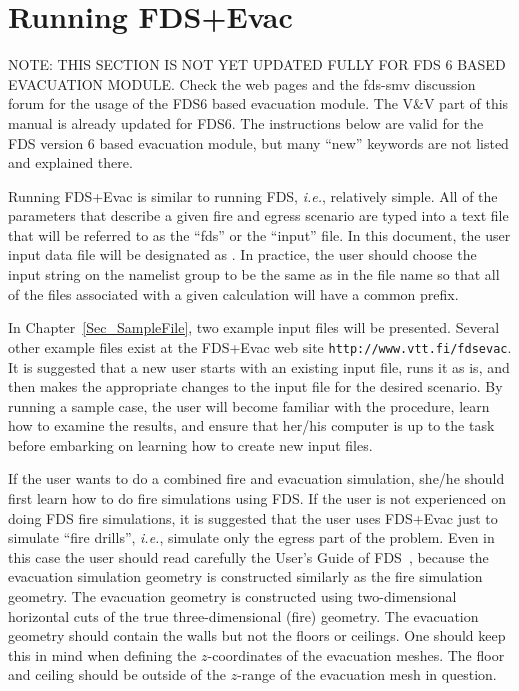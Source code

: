 \documentclass[12pt,a4paper,final,twoside]{stylevk}
\begin{document}
\clearpage

\newpage


\chapter{Running FDS+Evac}\label{Sec_Running}

\noindent NOTE: THIS SECTION IS NOT YET UPDATED FULLY FOR FDS 6 BASED
EVACUATION MODULE. Check the web pages and the fds-smv discussion
forum for the usage of the FDS6 based evacuation module. The V\&V part
of this manual is already updated for FDS6.  The instructions below
are valid for the FDS version 6 based evacuation module, but many
``new'' keywords are not listed and explained there.

\noindent Running FDS+Evac is similar to running FDS, \emph{i.e.},
relatively simple.  All of the parameters that describe a given fire
and egress scenario are typed into a text file that will be referred
to as the ``fds'' or the ``input'' file.  In this document, the user
input data file will be designated as .  In practice,
the user should choose the input string  on the
 namelist group to be the same as in the file name so that
all of the files associated with a given calculation will have a
common prefix.


In Chapter~\ref{Sec_SampleFile}, two example input files will be
presented.  Several other example files exist at the FDS+Evac web site
\verb+http://www.vtt.fi/fdsevac+.  It is suggested that a new user
starts with an existing input file, runs it as is, and then makes the
appropriate changes to the input file for the desired scenario.  By
running a sample case, the user will become familiar with the
procedure, learn how to examine the results, and ensure that her/his
computer is up to the task before embarking on learning how to create
new input files.


If the user wants to do a combined fire and evacuation simulation,
she/he should first learn how to do fire simulations using FDS.  If
the user is not experienced on doing FDS fire simulations, it is
suggested that the user uses FDS+Evac just to simulate ``fire
drills'', \emph{i.e.}, simulate only the egress part of the problem.
Even in this case the user should read carefully the User's Guide of
FDS~\cite{FDS_UserGuide}, because the evacuation simulation geometry
is constructed similarly as the fire simulation geometry.  The
evacuation geometry is constructed using two-dimensional horizontal
cuts of the true three-dimensional (fire) geometry.  The evacuation
geometry should contain the walls but not the floors or ceilings.  One
should keep this in mind when defining the $z$-coordinates of the
evacuation meshes.  The floor and ceiling should be outside of the
$z$-range of the evacuation mesh in question.
\end{document}
